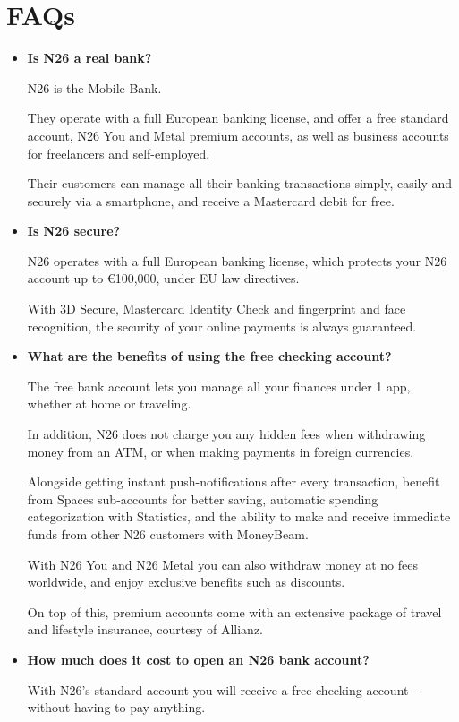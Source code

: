 \documentclass[onsided]{book}
\numberwithin{equation}{section}
\begin{document}
\section{FAQs}
\begin{itemize}
    \item \textbf{Is N26 a real bank?}
    
    N26 is the Mobile Bank.
    
    They operate with a full European banking license, and offer a free standard account, N26 You and Metal premium accounts, as well as business accounts for freelancers and self-employed.
    
    Their customers can manage all their banking transactions simply, easily and securely via a smartphone, and receive a Mastercard debit for free.
    \item \textbf{Is N26 secure?}
    
    N26 operates with a full European banking license, which protects your N26 account up to €100,000, under EU law directives.
    
    With 3D Secure, Mastercard Identity Check and fingerprint and face recognition, the security of your online payments is always guaranteed.
    \item \textbf{What are the benefits of using the free checking account?}
    
    The free bank account lets you manage all your finances under 1 app, whether at home or traveling.
    
    In addition, N26 does not charge you any hidden fees when withdrawing money from an ATM, or when making payments in foreign currencies.
    
    Alongside getting instant push-notifications after every transaction, benefit from Spaces sub-accounts for better saving, automatic spending categorization with Statistics, and the ability to make and receive immediate funds from other N26 customers with MoneyBeam.
    
    With N26 You and N26 Metal you can also withdraw money at no fees worldwide, and enjoy exclusive benefits such as discounts.
    
    On top of this, premium accounts come with an extensive package of travel and lifestyle insurance, courtesy of Allianz.
    \item \textbf{How much does it cost to open an N26 bank account?}
    
    With N26's standard account you will receive a free checking account - without having to pay anything.
    

\end{itemize}
\end{document}
